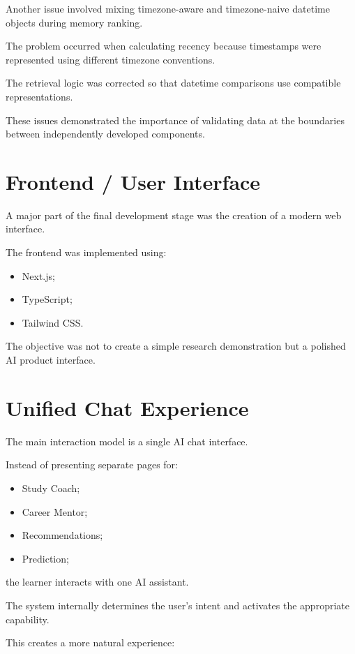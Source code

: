 \documentclass[12pt,a4paper]{article}
\begin{document}
Another issue involved mixing timezone-aware and timezone-naive datetime objects during memory ranking.

The problem occurred when calculating recency because timestamps were represented using different timezone conventions.

The retrieval logic was corrected so that datetime comparisons use compatible representations.

These issues demonstrated the importance of validating data at the boundaries between independently developed components.

\section{Frontend / User Interface}
A major part of the final development stage was the creation of a modern web interface.

The frontend was implemented using:
\begin{itemize}[noitemsep,topsep=2pt]
    \item Next.js;
    \item TypeScript;
    \item Tailwind CSS.
\end{itemize}

The objective was not to create a simple research demonstration but a polished AI product interface.

\section{Unified Chat Experience}
The main interaction model is a single AI chat interface.

Instead of presenting separate pages for:
\begin{itemize}[noitemsep,topsep=2pt]
    \item Study Coach;
    \item Career Mentor;
    \item Recommendations;
    \item Prediction;
\end{itemize}
the learner interacts with one AI assistant.

The system internally determines the user's intent and activates the appropriate capability.

This creates a more natural experience:
\end{document}
